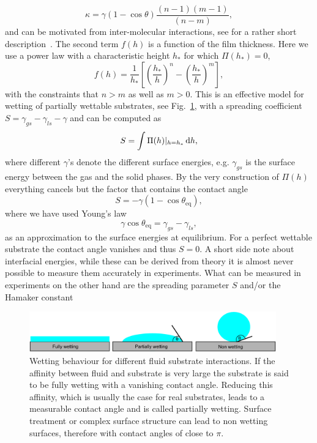 \begin{equation}\label{eq:disj_kappa}
    \kappa = \gamma (1 - \cos\theta) \frac{(n-1)(m-1)}{(n-m)},
\end{equation}
and can be motivated from inter-molecular interactions, see for a rather short description~\cite{MAHADY2015243}.
The second term $f(h)$ is a function of the film thickness.
Here we use a power law with a characteristic height $h_{\ast}$ for which $\Pi(h_{\ast}) = 0$,
\begin{equation}\label{eq:disj_fofh}
    f(h) = \frac{1}{h_{\ast}}\left[\left(\frac{h_{\ast}}{h}\right)^n - \left(\frac{h_{\ast}}{h}\right)^m \right],
\end{equation}
with the constraints that $n>m$ as well as $m > 0$.
This is an effective model for wetting of partially wettable substrates, see Fig.~\ref{fig:wetting_angle}, with a spreading coefficient $S = \gamma_{gs} - \gamma_{ls} - \gamma$ and can be computed as~\cite{Peschka9275}
\begin{equation}\label{eq:disj_spreading}
    S = \int\Pi(h)|_{h=h_{\ast}} \mathop{}\!\mathrm{d} h, 
\end{equation}
where different $\gamma$'s denote the different surface energies, e.g. $\gamma_{gs}$ is the surface energy between the gas and the solid phases.
By the very construction of $\Pi(h)$ everything cancels but the factor that contains the contact angle  
\begin{equation}\label{eq:disj_young}
    S = -\gamma(1 - \cos\theta_{\text{eq}}),
\end{equation}\label{eq:Youngs_law}
where we have used Young's law~\cite{doi:10.1098/rstl.1805.0005}
\begin{equation}
    \gamma\cos\theta_{\text{eq}} = \gamma_{gs} - \gamma_{ls},
\end{equation}
as an approximation to the surface energies at equilibrium.
For a perfect wettable substrate the contact angle vanishes and thus $S=0$.
A short side note about interfacial energies, while these can be derived from theory it is almost never possible to measure them accurately in experiments.
What can be measured in experiments on the other hand are the spreading parameter $S$ and/or the Hamaker constant~\cite{RevModPhys.81.739, PhysRevE.93.013120, Peschka9275} 
\begin{figure}
    \centering
    \includegraphics[width=0.95\textwidth]{graphics/Wettings.pdf}
    \caption{Wetting behaviour for different fluid substrate interactions.
    If the affinity between fluid and substrate is very large the substrate is said to be fully wetting with a vanishing contact angle.
    Reducing this affinity, which is usually the case for real substrates, leads to a measurable contact angle and is called partially wetting.
    Surface treatment or complex surface structure can lead to non wetting surfaces, therefore with contact angles of close to $\pi$.}
    \label{fig:wetting_angle}
\end{figure} 

